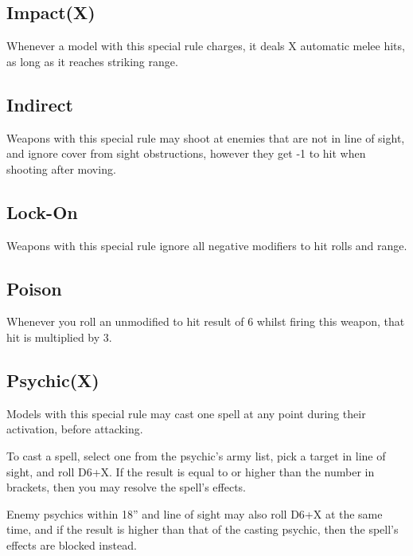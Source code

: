 \documentclass[9pt, a4paper, bookmarks=false]{extarticle}            %
\begin{document}
\vspace*{0.2cm}

\begin{multicols*}{2}

\subsection{Impact(X)}

Whenever a model with this special rule charges, it deals X automatic melee hits, as long as it reaches striking range.

\subsection{Indirect}

Weapons with this special rule may shoot at enemies that are not in line of sight, and ignore cover from sight obstructions, however they get -1 to hit when shooting after moving.

\subsection{Lock-On}

Weapons with this special rule ignore all negative modifiers to hit rolls and range.

\subsection{Poison}

Whenever you roll an unmodified to hit result of 6 whilst firing this weapon, that hit is multiplied by 3.

\subsection{Psychic(X)}

Models with this special rule may cast one spell at any point during their activation, before attacking.

To cast a spell, select one from the psychic’s army list, pick a target in line of sight, and roll D6+X. If the result is equal to or higher than the number in brackets, then you may resolve the spell’s effects.

Enemy psychics within 18” and line of sight may also roll D6+X at the same time, and if the result is higher than that of the casting psychic, then the spell’s effects are blocked instead.


\end{multicols*}
\end{document}
